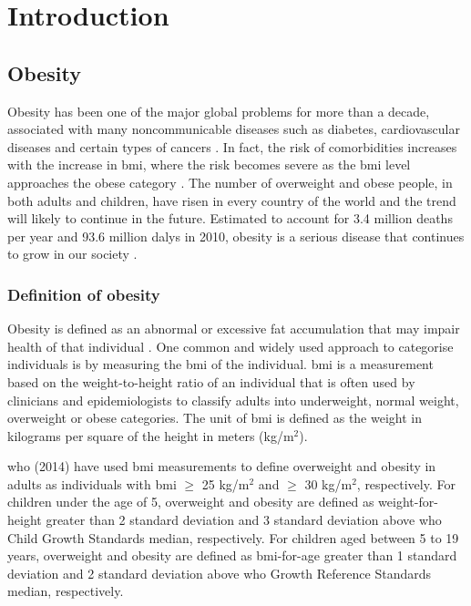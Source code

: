 \chapter{Introduction}
\label{ch:intro}

\section{Obesity}
\label{sec:obesity}

Obesity has been one of the major global problems for more than a decade, associated with many noncommunicable diseases such as diabetes, cardiovascular diseases and certain types of cancers \citep{WHO2014}.
In fact, the risk of comorbidities increases with the increase in \gls{bmi}, where the risk becomes severe as the \gls{bmi} level approaches the obese category \citep{WHO2000}.
The number of overweight and obese people, in both adults and children, have risen in every country of the world and the trend will likely to continue in the future.
Estimated to account for 3.4 million deaths per year and 93.6 million \glspl{daly} in 2010, obesity is a serious disease that continues to grow in our society \citep{Lim2012}.

\subsection{Definition of obesity}
\label{sub:definition_of_obesity}

Obesity is defined as an abnormal or excessive fat accumulation that may impair health of that individual \citep{Garrow1988}.
One common and widely used approach to categorise individuals is by measuring the \gls{bmi} of the individual.
\gls{bmi} is a measurement based on the weight-to-height ratio of an individual that is often used by clinicians and epidemiologists to classify adults into underweight, normal weight, overweight or obese categories.
The unit of \gls{bmi} is defined as the weight in kilograms per square of the height in meters (kg/m$^2$).

\gls{who} (2014) have used \gls{bmi} measurements to define overweight and obesity in adults as individuals with \gls{bmi} $\geq$ 25 kg/m$^2$ and $\geq$ 30 kg/m$^2$, respectively.
For children under the age of 5, overweight and obesity are defined as weight-for-height greater than 2 standard deviation and 3 standard deviation above \gls{who} Child Growth Standards median, respectively.
For children aged between 5 to 19 years, overweight and obesity are defined as \gls{bmi}-for-age greater than 1 standard deviation and 2 standard deviation above \gls{who} Growth Reference Standards median, respectively.

